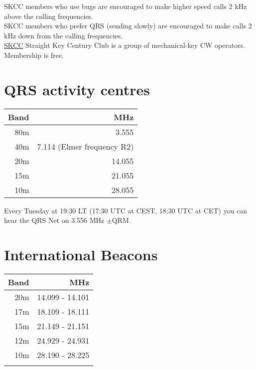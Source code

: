 \documentclass[10pt]{article}
\begin{document}
\begin{multicols}{3}
SKCC members who use bugs are encouraged to make higher speed calls 2 kHz above the calling frequencies.\\ 

SKCC members who prefer QRS (sending slowly) are encouraged to make calls 2 kHz down from the calling frequencies.\\

\href{http://www.skccgroup.com}{SKCC} Straight Key Century Club is a group of mechanical-key CW operators. Membership is free.

\section{QRS activity centres}
\vspace{\baselineskip}
\begin{tabular}{rr}
Band & MHz\\ \hline 
 80m & 3.555\\
 40m & 7.114 (Elmer frequency R2)\\
 20m & 14.055\\
 15m & 21.055\\
 10m & 28.055\\
\end{tabular}
\vspace{\baselineskip}

Every Tuesday at 19:30 LT (17:30 UTC at CEST, 18:30 UTC at CET) you can hear the QRS Net on 3.556 MHz $\pm$QRM. 

\section{International Beacons}

\begin{tabular}{rr}
Band & MHz \\ \hline 
 20m & 14.099 - 14.101 \\ 
 17m & 18.109 - 18.111 \\ 
 15m & 21.149 - 21.151 \\ 
 12m & 24.929 - 24.931 \\ 
 10m & 28.190 - 28.225 \\
     &       \\     
\end{tabular}


\end{multicols}
\end{document}
